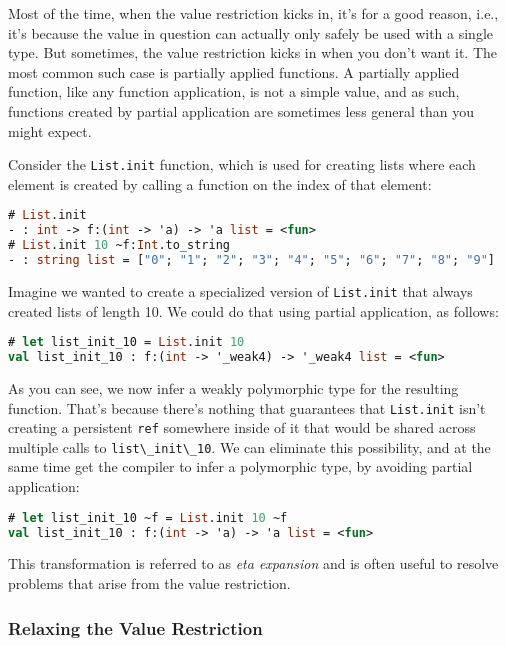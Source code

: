 Most of the time, when the value restriction kicks in, it's for a good
reason, i.e., it's because the value in question can actually only
safely be used with a single type. But sometimes, the value restriction
kicks in when you don't want it. The most common such case is partially
applied functions. A partially applied function, like any function
application, is not a simple value, and as such, functions created by
partial application are sometimes less general than you might expect.

Consider the \passthrough{\lstinline!List.init!} function, which is used
for creating lists where each element is created by calling a function
on the index of that element:

\begin{lstlisting}[language=Caml]
# List.init
- : int -> f:(int -> 'a) -> 'a list = <fun>
# List.init 10 ~f:Int.to_string
- : string list = ["0"; "1"; "2"; "3"; "4"; "5"; "6"; "7"; "8"; "9"]
\end{lstlisting}

Imagine we wanted to create a specialized version of
\passthrough{\lstinline!List.init!} that always created lists of length
10. We could do that using partial application, as follows:

\begin{lstlisting}[language=Caml]
# let list_init_10 = List.init 10
val list_init_10 : f:(int -> '_weak4) -> '_weak4 list = <fun>
\end{lstlisting}

As you can see, we now infer a weakly polymorphic type for the resulting
function. That's because there's nothing that guarantees that
\passthrough{\lstinline!List.init!} isn't creating a persistent
\passthrough{\lstinline!ref!} somewhere inside of it that would be
shared across multiple calls to
\passthrough{\lstinline!list\_init\_10!}. We can eliminate this
possibility, and at the same time get the compiler to infer a
polymorphic type, by avoiding partial application:

\begin{lstlisting}[language=Caml]
# let list_init_10 ~f = List.init 10 ~f
val list_init_10 : f:(int -> 'a) -> 'a list = <fun>
\end{lstlisting}

This transformation is referred to as \emph{eta expansion} and is often
useful to resolve problems that arise from the value restriction.

\hypertarget{relaxing-the-value-restriction}{%
\subsubsection{Relaxing the Value
Restriction}\label{relaxing-the-value-restriction}}

